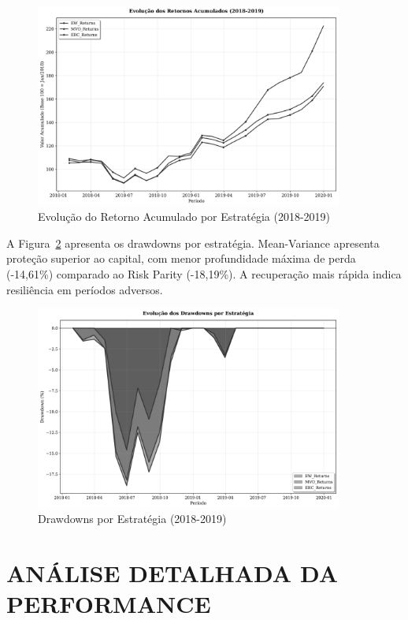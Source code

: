 \begin{figure}[H]
\centering
\includegraphics[width=0.9\textwidth]{figures/retornos_acumulados.png}
\caption{Evolução do Retorno Acumulado por Estratégia (2018-2019)}
\label{fig:retornos_acumulados}
\end{figure}

A Figura~\ref{fig:drawdowns} apresenta os drawdowns por estratégia. Mean-Variance apresenta proteção superior ao capital, com menor profundidade máxima de perda (-14,61\%) comparado ao Risk Parity (-18,19\%). A recuperação mais rápida indica resiliência em períodos adversos.

\begin{figure}[H]
\centering
\includegraphics[width=0.9\textwidth]{figures/drawdowns.png}
\caption{Drawdowns por Estratégia (2018-2019)}
\label{fig:drawdowns}
\end{figure}

\section{ANÁLISE DETALHADA DA PERFORMANCE}


